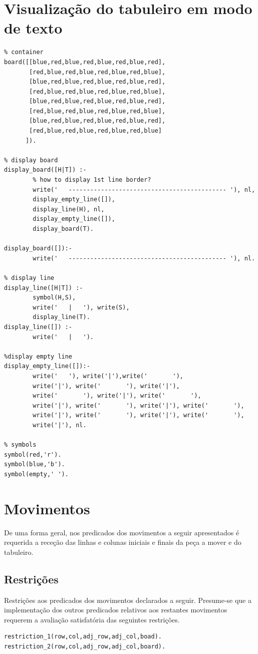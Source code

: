 \documentclass[a4paper,11pt,titlepage]{article}
\begin{document}
\section{Visualização do tabuleiro em modo de texto}

\begin{verbatim}
% container
board([[blue,red,blue,red,blue,red,blue,red],
       [red,blue,red,blue,red,blue,red,blue],
       [blue,red,blue,red,blue,red,blue,red],
       [red,blue,red,blue,red,blue,red,blue],
       [blue,red,blue,red,blue,red,blue,red],
       [red,blue,red,blue,red,blue,red,blue],
       [blue,red,blue,red,blue,red,blue,red],
       [red,blue,red,blue,red,blue,red,blue]
      ]).

% display board
display_board([H|T]) :- 
        % how to display 1st line border?
        write('   -------------------------------------------- '), nl,
        display_empty_line([]),
        display_line(H), nl,
        display_empty_line([]),
        display_board(T).

display_board([]):-
        write('   -------------------------------------------- '), nl.

% display line
display_line([H|T]) :-
        symbol(H,S),
        write('   |   '), write(S), 
        display_line(T).
display_line([]) :-
        write('   |   ').

%display empty line
display_empty_line([]):-
        write('   '), write('|'),write('       '),
        write('|'), write('       '), write('|'),
        write('       '), write('|'), write('       '),
        write('|'), write('       '), write('|'), write('       '),
        write('|'), write('       '), write('|'), write('       '),
        write('|'), nl.

% symbols
symbol(red,'r').
symbol(blue,'b').
symbol(empty,' ').
\end{verbatim}

\section{Movimentos}

De uma forma geral, nos predicados dos movimentos a seguir apresentados é requerida a receção das linhas e colunas iniciais e finais da peça a mover e do tabuleiro.
\subsection{Restrições}
Restrições aos predicados dos movimentos declarados a seguir. Presume-se que a implementação dos outros predicados relativos aos restantes movimentos requerem a avaliação satisfatória das seguintes restrições.
\begin{verbatim}
restriction_1(row,col,adj_row,adj_col,boad).
restriction_2(row,col,adj_row,adj_col,board).
\end{verbatim}
\end{document}
